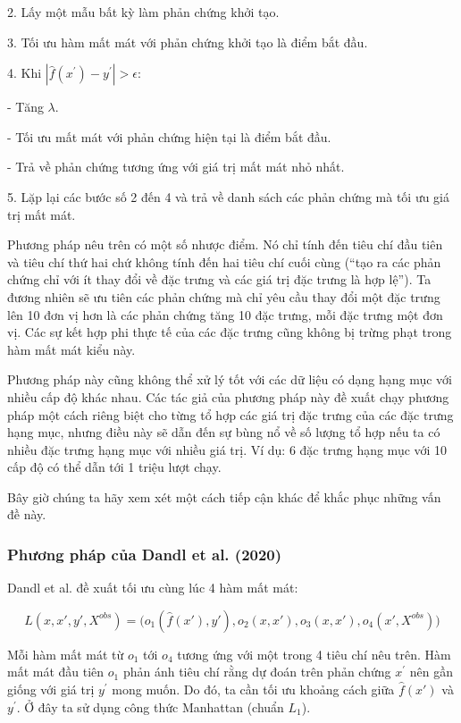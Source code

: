 2. Lấy một mẫu bất kỳ làm phản chứng khởi tạo.

3. Tối ưu hàm mất mát với phản chứng khởi tạo là điểm bắt đầu.

4. Khi $|\hat{f}(x^\prime)-y^\prime|>\epsilon$:

- Tăng $\lambda$.

- Tối ưu mất mát với phản chứng hiện tại là điểm bắt đầu.

- Trả về phản chứng tương ứng với giá trị mất mát nhỏ nhất.

5. Lặp lại các bước số 2 đến 4 và trả về danh sách các phản chứng mà tối ưu giá trị mất mát.

Phương pháp nêu trên có một số nhược điểm. Nó chỉ tính đến tiêu chí đầu tiên và tiêu chí thứ hai chứ không tính đến hai tiêu chí cuối cùng (``tạo ra các phản chứng chỉ với ít thay đổi về đặc trưng và các giá trị đặc trưng là hợp lệ''). Ta đương nhiên sẽ ưu tiên các phản chứng mà chỉ yêu cầu thay đổi một đặc trưng lên 10 đơn vị hơn là các phản chứng tăng 10 đặc trưng, mỗi đặc trưng một đơn vị. Các sự kết hợp phi thực tế của các đặc trưng cũng không bị trừng phạt trong hàm mất mát kiểu này.

Phương pháp này cũng không thể xử lý tốt với các dữ liệu có dạng hạng mục với nhiều cấp độ khác nhau. Các tác giả của phương pháp này đề xuất chạy phương pháp một cách riêng biệt cho từng tổ hợp các giá trị đặc trưng của các đặc trưng hạng mục, nhưng điều này sẽ dẫn đến sự bùng nổ về số lượng tổ hợp nếu ta có nhiều đặc trưng hạng mục với nhiều giá trị. Ví dụ: 6 đặc trưng hạng mục với 10 cấp độ có thể dẫn tới 1 triệu lượt chạy.

Bây giờ chúng ta hãy xem xét một cách tiếp cận khác để khắc phục những vấn đề này.

\subsubsection{Phương pháp của Dandl et al. (2020)}
Dandl et al. đề xuất tối ưu cùng lúc 4 hàm mất mát:

$$L(x,x',y',X^{obs})=\big(o_1(\hat{f}(x'),y'),o_2(x, x'),o_3(x,x'),o_4(x',X^{obs})\big)$$

Mỗi hàm mất mát từ $o_1$ tới $o_4$ tương ứng với một trong 4 tiêu chí nêu trên. Hàm mất mát đầu tiên $o_1$ phản ánh tiêu chí rằng dự đoán trên phản chứng $x^\prime$ nên gần giống với giá trị $y^\prime$ mong muốn. Do đó, ta cần tối ưu khoảng cách giữa $\hat{f}(x')$ và  $y^\prime$. Ở đây ta sử dụng công thức Manhattan (chuẩn $L_1$).

